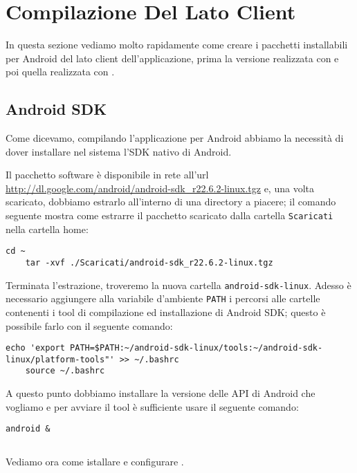\chapter{Compilazione Del Lato Client}

In questa sezione vediamo molto rapidamente come creare i pacchetti installabili
per Android del lato client dell'applicazione, prima la versione realizzata con
\pg{} e poi quella realizzata con \tisdk{}.

\section{Android SDK}
    Come dicevamo, compilando l'applicazione per Android abbiamo la necessità di
    dover installare nel sistema l'SDK nativo di Android.
    
    Il pacchetto software è disponibile in rete all'url
    \url{http://dl.google.com/android/android-sdk_r22.6.2-linux.tgz} e, una
    volta scaricato, dobbiamo estrarlo all'interno di una directory a piacere;
    il comando seguente mostra come estrarre il pacchetto scaricato dalla 
    cartella \texttt{Scaricati} nella cartella home:
    \begin{lstlisting}[language=plane]
    cd ~
    tar -xvf ./Scaricati/android-sdk_r22.6.2-linux.tgz
    \end{lstlisting}
    Terminata l'estrazione, troveremo la nuova cartella
    \texttt{android-sdk-linux}. Adesso è necessario aggiungere alla 
    variabile d'ambiente \texttt{PATH} i percorsi alle cartelle contenenti i 
    tool di compilazione ed installazione di Android SDK; questo è possibile 
    farlo con il seguente comando:
    \begin{lstlisting}[language=plane]
    echo 'export PATH=$PATH:~/android-sdk-linux/tools:~/android-sdk-linux/platform-tools"' >> ~/.bashrc
    source ~/.bashrc
    \end{lstlisting}
    A questo punto dobbiamo installare la versione delle API di Android che 
    vogliamo e per avviare il tool è sufficiente usare il seguente comando:
    \begin{lstlisting}[language=plane]
    android &
    \end{lstlisting}
     

\section{\pg{}}
    Vediamo ora come istallare e configurare \pg{}.
    

